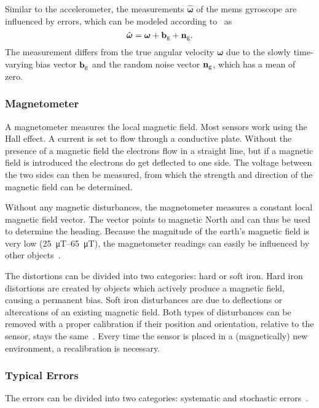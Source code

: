 Similar to the accelerometer, the measurements $\hat{\boldsymbol{\omega}}$ of the \gls{mems} gyroscope are influenced by errors, which can be modeled according to~\cite{Lefferts1982} as
\begin{equation}
    \hat{\boldsymbol{\omega}} = \boldsymbol{\omega} + \vb{b}_\mathrm{g} + \vb{n}_\mathrm{g}.
\end{equation}
The measurement differs from the true angular velocity $\boldsymbol{\omega}$ due to the slowly time-varying bias vector $\vb{b}_\mathrm{g}$ and the random noise vector $\vb{n}_\mathrm{g}$, which has a mean of zero.

\subsubsection{ Magnetometer}
A magnetometer measures the local magnetic field.
Most sensors work using the Hall effect.
A current is set to flow through a conductive plate.
Without the presence of a magnetic field the electrons flow in a straight line, but if a magnetic field is introduced the electrons do get deflected to one side.
The voltage between the two sides can then be measured, from which the strength and direction of the magnetic field can be determined.

Without any magnetic disturbances, the magnetometer measures a constant local magnetic field vector.
The vector points to magnetic North and can thus be used to determine the heading.
Because the magnitude of the earth's magnetic field is very low (\SIrange{25}{65}{\micro\tesla}), the magnetometer readings can easily be influenced by other objects~\cite{Kok2016}.

The distortions can be divided into two categories: hard or soft iron.
Hard iron distortions are created by objects which actively produce a magnetic field, causing a permanent bias.
Soft iron disturbances are due to deflections or altercations of an existing magnetic field.
Both types of disturbances can be removed with a proper calibration if their position and orientation, relative to the sensor, stays the same~\cite{Guo2008}.
Every time the sensor is placed in a (magnetically) new environment, a recalibration is necessary.

\subsubsection{Typical  Errors}
\label{sse:mems_errors}
The errors can be divided into two categories: systematic and stochastic errors~\cite{Zhang2019}.

